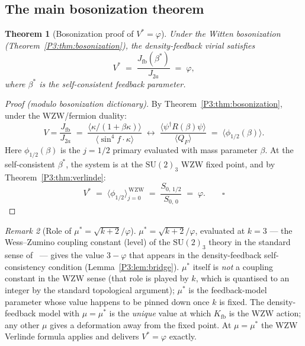 \documentclass[11pt,a4paper]{article}
\newtheorem{theorem}{Theorem}[section]
\theoremstyle{definition}
\theoremstyle{remark}
\newtheorem{remark}[theorem]{Remark}
\newcommand{\vp}{\varphi}
\begin{document}
\subsection{The main bosonization theorem}

\begin{theorem}[Bosonization proof of $V^* = \vp$]
\label{P3:thm:bos_main}
Under the Witten bosonization (Theorem~\ref{P3:thm:bosonization}), the density-feedback
virial satisfies
\begin{equation}
  V^* \;=\; \frac{J_{\mathrm{fb}}(\beta^*)}{J_{2a}} \;=\; \vp,
\end{equation}
where $\beta^*$ is the self-consistent feedback parameter.
\end{theorem}

\begin{proof}[Proof (modulo bosonization dictionary)]
By Theorem~\ref{P3:thm:bosonization}, under the WZW/fermion duality:
\begin{equation}
  V = \frac{J_{\mathrm{fb}}}{J_{2a}}
  \;=\; \frac{\langle\kappa/(1+\beta\kappa)\rangle}{\langle\sin^4\!f\cdot\kappa\rangle}
  \;\longleftrightarrow\;
  \frac{\langle\psi^\dagger R(\beta)\psi\rangle}{\langle Q_F\rangle}
  \;=\; \langle\phi_{1/2}(\beta)\rangle.
\end{equation}
Here $\phi_{1/2}(\beta)$ is the $j=1/2$ primary evaluated with mass parameter $\beta$.
At the self-consistent $\beta^*$, the system is at the $\mathrm{SU}(2)_3$ WZW fixed point,
and by Theorem~\ref{P3:thm:verlinde}:
\begin{equation}
  V^* \;=\; \langle\phi_{1/2}\rangle_{j=0}^{\,\mathrm{WZW}}
  \;=\; \frac{S_{0,\,1/2}}{S_{0,\,0}}
  \;=\; \vp. \qquad\square
\end{equation}
\end{proof}

\begin{remark}[Role of $\mu^* = \sqrt{k+2}/\vp$]
\label{P3:rem:mustar_role}
$\mu^*=\sqrt{k+2}/\vp$, evaluated at $k=3$ --- the Wess--Zumino coupling
constant (level) of the $\mathrm{SU}(2)_3$ theory in the standard sense
of~\cite{Witten1984} --- gives the value $3-\vp$ that appears in the
density-feedback self-consistency condition (Lemma~\ref{P3:lem:bridge}).
$\mu^*$ itself is \emph{not} a coupling constant in the WZW sense (that
role is played by $k$, which is quantised to an integer by the standard
topological argument); $\mu^*$ is the feedback-model parameter whose
value happens to be pinned down once $k$ is fixed.
The density-feedback model with $\mu = \mu^*$ is the \emph{unique} value
at which $K_{\mathrm{fb}}$ is the WZW action; any other $\mu$ gives a
deformation away from the fixed point.  At $\mu = \mu^*$ the WZW Verlinde
formula applies and delivers $V^* = \vp$ exactly.
\end{remark}
\end{document}
